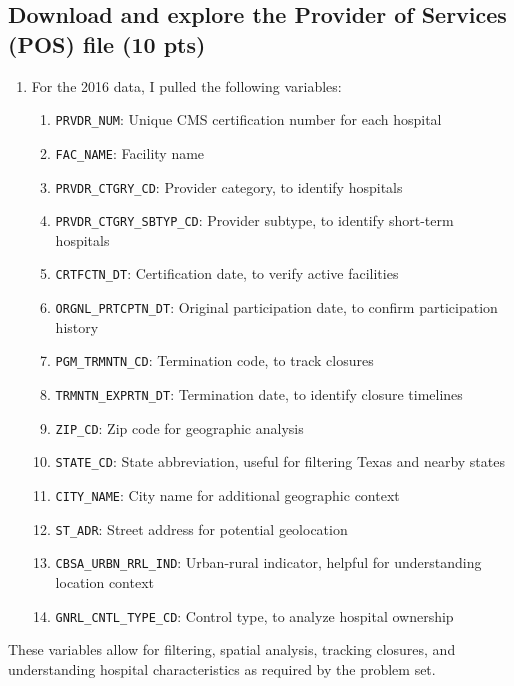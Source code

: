 \documentclass[
  letterpaper,
  DIV=11,
  numbers=noendperiod]{scrartcl}
\providecommand{\tightlist}{%
  \setlength{\itemsep}{0pt}\setlength{\parskip}{0pt}}\usepackage{longtable,booktabs,array}
\begin{document}
\subsection{Download and explore the Provider of Services (POS) file (10
pts)}\label{download-and-explore-the-provider-of-services-pos-file-10-pts}

\begin{enumerate}
\def\labelenumi{\arabic{enumi}.}
\item
  For the 2016 data, I pulled the following variables:

  \begin{enumerate}
  \def\labelenumii{\roman{enumii}.}
  \tightlist
  \item
    \texttt{PRVDR\_NUM}: Unique CMS certification number for each
    hospital
  \item
    \texttt{FAC\_NAME}: Facility name
  \item
    \texttt{PRVDR\_CTGRY\_CD}: Provider category, to identify hospitals
  \item
    \texttt{PRVDR\_CTGRY\_SBTYP\_CD}: Provider subtype, to identify
    short-term hospitals
  \item
    \texttt{CRTFCTN\_DT}: Certification date, to verify active
    facilities
  \item
    \texttt{ORGNL\_PRTCPTN\_DT}: Original participation date, to confirm
    participation history
  \item
    \texttt{PGM\_TRMNTN\_CD}: Termination code, to track closures
  \item
    \texttt{TRMNTN\_EXPRTN\_DT}: Termination date, to identify closure
    timelines
  \item
    \texttt{ZIP\_CD}: Zip code for geographic analysis
  \item
    \texttt{STATE\_CD}: State abbreviation, useful for filtering Texas
    and nearby states
  \item
    \texttt{CITY\_NAME}: City name for additional geographic context
  \item
    \texttt{ST\_ADR}: Street address for potential geolocation
  \item
    \texttt{CBSA\_URBN\_RRL\_IND}: Urban-rural indicator, helpful for
    understanding location context
  \item
    \texttt{GNRL\_CNTL\_TYPE\_CD}: Control type, to analyze hospital
    ownership
  \end{enumerate}
\end{enumerate}

These variables allow for filtering, spatial analysis, tracking
closures, and understanding hospital characteristics as required by the
problem set.
\end{document}
